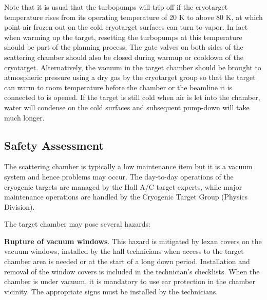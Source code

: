 {%

Note that it is usual that the turbopumps will trip off if the
cryotarget temperature rises from its operating temperature of 20 K to
above 80 K, at which point air frozen out on the cold cryotarget
surfaces can turn to vapor. In fact when warming up the target,
resetting the turbopumps at this temperature should be part of the
planning process. The gate valves on both sides of the scattering
chamber should also be closed during warmup or cooldown of the
cryotarget. Alternatively, the vacuum in the target chamber should be
brought to atmospheric pressure using a dry gas by the cryotarget
group so that the target can warm to room temperature before the
chamber or the beamline it is connected to is opened. If the target is
still cold when air is let into the chamber, water will condense on
the cold surfaces and subsequent pump-down will take much longer.

\begin{safetyen}{0}{0}
\subsection{Safety Assessment}


The scattering chamber is typically a low maintenance item but it is a
vacuum system and hence problems may occur. The day-to-day operations
of the cryogenic targets are managed by the Hall A/C target experts,
while major maintenance operations are handled by the Cryogenic Target
Group (Physics Division).

The target chamber may pose several hazards:

\begin{list}{.~}{\setlength{\itemsep}{-0.15cm}}
  \item {\bf Rupture of vacuum windows}. This hazard is mitigated by
    lexan covers on the vacuum windows, installed by the hall
    technicians when access to
    the target chamber area is needed or at the start of a long
    down period.
    Installation and removal of the window covers is included in the
    technician's checklists.  When the chamber is under vacuum, it is
    mandatory to use ear protection in the chamber vicinity. The
    appropriate signs must be installed by the technicians.


\end{list}
\end{safetyen}}
